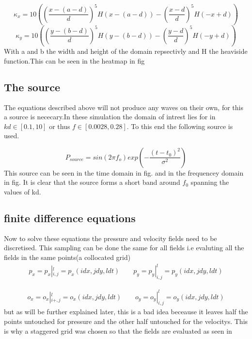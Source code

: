 \documentclass{article}
\begin{document}
 \begin{equation}
     \kappa_{x}=10((\frac{x-(a-d)}{d})^5H(x-(a-d))-(\frac{x-d}{d})^5H(-x+d))
 \end{equation}
  \begin{equation}
     \kappa_{y}=10((\frac{y-(b-d)}{d})^5H(y-(b-d))-(\frac{y-d}{d})^5H(-y+d))
 \end{equation}
With a and b the width and height of the domain repsectivly and H the heaviside function.This can be seen in the heatmap in fig

\subsection{The source}
The equations described above will not produce any waves on their own, for this a source is nececary.In these simulation the domain of intrest lies for in $kd \in[0.1,10]$ or thus $f \in[0.0028,0.28]$. To this end the following source is used.

\begin{equation}
    P_{source}=sin(2 \pi f_o) exp(-\frac{(t-t_0)^2}{\sigma^2})
\end{equation}
 This source can be seen in the time domain in fig. and in the frequencey domain in fig. It is clear that the source forms a short band around $f_0$ spanning the values of kd.
 



\subsection{finite difference equations}
Now to solve these equations the pressure and velocity fields need to be discretised. This sampling can be done the same for all fields i.e evaluting all the fields in the same points(a collocated grid)
\begin{equation}
\begin{gathered}
p_x=p_x|_{i,j}^l=p_x(idx,jdy,ldt) \qquad
p_y= p_y|_{i,j}^l=p_y(idx,jdy,ldt)  
\end{gathered}
\end{equation}

\begin{equation}
\begin{gathered}
o_x= o_x|_{i+,j}^{l}=o_x(idx,jdy,ldt)   \qquad
o_y= o_y|_{i,j}^{l}=o_y(idx,jdy,ldt) 
\end{gathered}
\end{equation}
but as will be further explained later, this is a bad idea beceause it leaves half the points untouched for pressure and the other half untouched for the velocitys. This is why a staggered grid was chosen so that the fields are evaluated as seen in
\end{document}
